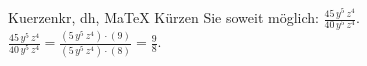 \begin{MAufgabe}{Kuerzen}{kr, dh, MaTeX}
K\"urzen Sie soweit m\"oglich: $\frac{45\, y^5\, z^4}{40\, y^5\, z^4}$.\\ 
\ifLsg\MLoesung
\quad $\frac{45\, y^5\, z^4}{40\, y^5\, z^4}=\frac{(5\, y^5\, z^4)\cdot(9)}{(5\, y^5\, z^4)\cdot(8)}=\frac{9}{8}$.\else\relax\fi
 \end{MAufgabe}